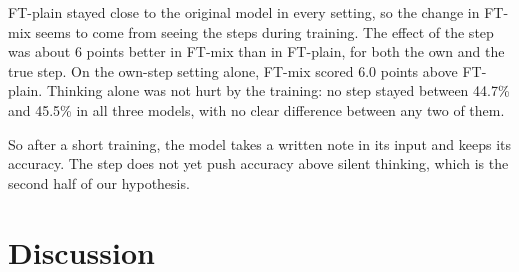 \documentclass[10pt,letterpaper]{article}
\begin{document}
FT-plain stayed close to the original model in every setting, so the change in FT-mix seems to come from seeing the steps during training. The effect of the step was about 6 points better in FT-mix than in FT-plain, for both the own and the true step. On the own-step setting alone, FT-mix scored 6.0 points above FT-plain. Thinking alone was not hurt by the training: no step stayed between 44.7\%
and 45.5\% in all three models, with no clear difference between any two of them.

So after a short training, the model takes a written note in its input and keeps its accuracy. The step does not
yet push accuracy above silent thinking, which is the second half of our hypothesis.

\section{Discussion}
\end{document}
